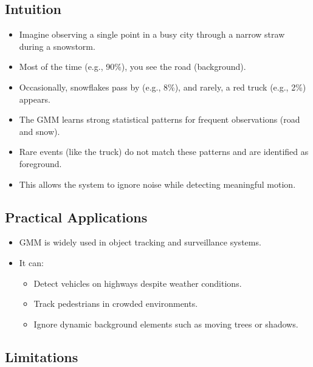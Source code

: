 \documentclass[12pt]{article}
\begin{document}
\subsection{Intuition}

\begin{itemize}
    \item Imagine observing a single point in a busy city through a narrow straw during a snowstorm.

    \item Most of the time (e.g., 90\%), you see the road (background).

    \item Occasionally, snowflakes pass by (e.g., 8\%), and rarely, a red truck (e.g., 2\%) appears.

    \item The GMM learns strong statistical patterns for frequent observations (road and snow).

    \item Rare events (like the truck) do not match these patterns and are identified as foreground.

    \item This allows the system to ignore noise while detecting meaningful motion.
\end{itemize}

\subsection{Practical Applications}

\begin{itemize}
    \item GMM is widely used in object tracking and surveillance systems.

    \item It can:
          \begin{itemize}
              \item Detect vehicles on highways despite weather conditions.
              \item Track pedestrians in crowded environments.
              \item Ignore dynamic background elements such as moving trees or shadows.
          \end{itemize}
\end{itemize}

\subsection{Limitations}
\end{document}

